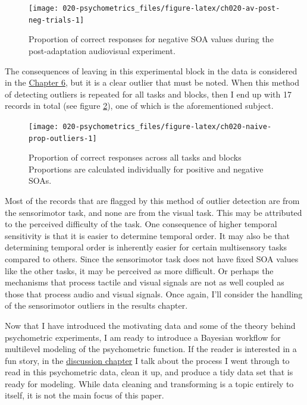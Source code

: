 \documentclass[11pt, oneside, openany]{scrbook}
\begin{document}
\begin{figure}

{\centering \texttt{[image: 020-psychometrics\_files/figure-latex/ch020-av-post-neg-trials-1]} 

}

\caption{Proportion of correct responses for negative SOA values during the post-adaptation audiovisual experiment.}\label{fig:ch020-av-post-neg-trials}
\end{figure}

The consequences of leaving in this experimental block in the data is considered in the \protect\hyperlink{results}{Chapter 6}, but it is a clear outlier that must be noted. When this method of detecting outliers is repeated for all tasks and blocks, then I end up with 17 records in total (see figure \ref{fig:ch020-naive-prop-outliers}), one of which is the aforementioned subject.

\begin{figure}

{\centering \texttt{[image: 020-psychometrics\_files/figure-latex/ch020-naive-prop-outliers-1]} 

}

\caption{Proportion of correct responses across all tasks and blocks Proportions are calculated individually for positive and negative SOAs.}\label{fig:ch020-naive-prop-outliers}
\end{figure}

Most of the records that are flagged by this method of outlier detection are from the sensorimotor task, and none are from the visual task. This may be attributed to the perceived difficulty of the task. One consequence of higher temporal sensitivity is that it is easier to determine temporal order. It may also be that determining temporal order is inherently easier for certain multisensory tasks compared to others. Since the sensorimotor task does not have fixed SOA values like the other tasks, it may be perceived as more difficult. Or perhaps the mechanisms that process tactile and visual signals are not as well coupled as those that process audio and visual signals. Once again, I'll consider the handling of the sensorimotor outliers in the results chapter.

Now that I have introduced the motivating data and some of the theory behind psychometric experiments, I am ready to introduce a Bayesian workflow for multilevel modeling of the psychometric function. If the reader is interested in a fun story, in the \protect\hyperlink{discussion}{discussion chapter} I talk about the process I went through to read in this psychometric data, clean it up, and produce a tidy data set that is ready for modeling. While data cleaning and transforming is a topic entirely to itself, it is not the main focus of this paper.
\end{document}
